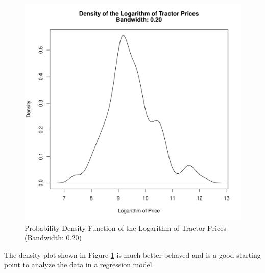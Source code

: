 \begin{figure}[h!]
  \centering
  \includegraphics[scale = 0.5, keepaspectratio=true]{../Figures/density_log_saleprice_bw020}
  \caption{Probability Density Function of the Logarithm of Tractor Prices (Bandwidth: $0.20$)} \label{fig:density_log_saleprice_bw020}
\end{figure}


The density plot
shown in Figure \ref{fig:density_log_saleprice_bw020}
is much better behaved and is a good starting point to
analyze the data in a regression model.



% 
